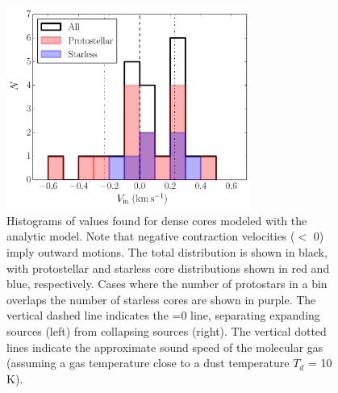 \documentclass[iop,twocolappendix]{emulateapj}
\begin{document}

\begin{figure}
\begin{center}
\includegraphics[width=8cm]{InfallHist.pdf}
\caption{Histograms of {\Vin} values found for dense cores modeled with the analytic {\Hill} model. Note that negative contraction velocities ({\Vin}$ < $ 0) imply outward motions. The total distribution is shown in black, with protostellar and starless core distributions shown in red and blue, respectively. Cases where the number of protostars in a bin overlaps the number of starless cores are shown in purple. The vertical dashed line indicates the {\Vin}=0 line, separating expanding sources (left) from collapsing sources (right). The vertical dotted lines indicate the approximate sound speed of the molecular gas (assuming a gas temperature close to a dust temperature $T_d$ = 10 K).}
\label{fig:infallhist}
\end{center}
\end{figure}
\end{document}
